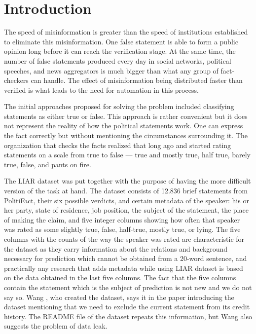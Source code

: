 
\section{Introduction}

The speed of misinformation is greater than the speed of institutions established to eliminate this misinformation. One false statement is able to form a public opinion long before it can reach the verification stage. At the same time, the number of false statements produced every day in social networks, political speeches, and news aggregators is much bigger than what any group of fact-checkers can handle. The effect of misinformation being distributed faster than verified is what leads to the need for automation in this process.

The initial approaches proposed for solving the problem included classifying statements as either true or false. This approach is rather convenient but it does not represent the reality of how the political statements work. One can express the fact correctly but without mentioning the circumstances surrounding it. The organization that checks the facts realized that long ago and started rating statements on a scale from true to false --- true and mostly true, half true, barely true, false, and pants on fire.

The LIAR dataset \cite{wang2017liar} was put together with the purpose of having the more difficult version of the task at hand. The dataset consists of 12.836 brief statements from PolitiFact, their six possible verdicts, and certain metadata of the speaker: his or her party, state of residence, job position, the subject of the statement, the place of making the claim, and five integer columns showing how often that speaker was rated as some slightly true, false, half-true, mostly true, or lying. The five columns with the counts of the way the speaker was rated are characteristic for the dataset as they carry information about the relations and background necessary for prediction which cannot be obtained from a 20-word sentence, and practically any research that adds metadata while using LIAR dataset is based on the data obtained in the last five columns. The fact that the five columns contain the statement which is the subject of prediction is not new and we do not say so. Wang \cite{wang2017liar}, who created the dataset, says it in the paper introducing the dataset mentioning that we need to exclude the current statement from its credit history. The README file of the dataset repeats this information, but Wang also suggests the problem of data leak.

